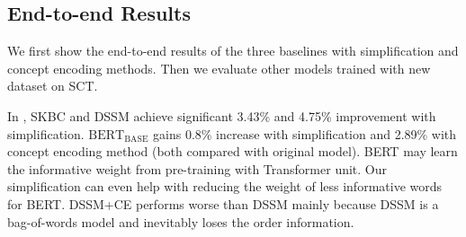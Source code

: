 \subsection{End-to-end Results}
\label{sec:result}
We first show the end-to-end results of the three baselines 
with simplification and concept encoding methods. Then we 
evaluate other models trained with new dataset on SCT.
\begin{table}
 \small
\centering
{}
\caption{End-to-end accuracy on SCT and SCT$_v$1.5 test sets. 
Original=baseline, Simp=simplification method, CE=concept encoding method
}
\label{tab:main}
\end{table} 
In , SKBC and DSSM achieve significant 3.43\% and 4.75\% improvement with simplification. 
$\text{BERT}_\text{BASE}$ gains 0.8\% increase with simplification and 
2.89\% with concept encoding method (both compared with original model). 
BERT may learn the informative weight from pre-training with Transformer unit. 
Our simplification can even help with reducing the weight of less informative 
words for BERT. DSSM+CE performs worse than DSSM 
mainly because DSSM is a bag-of-words model and inevitably loses the order information. 
